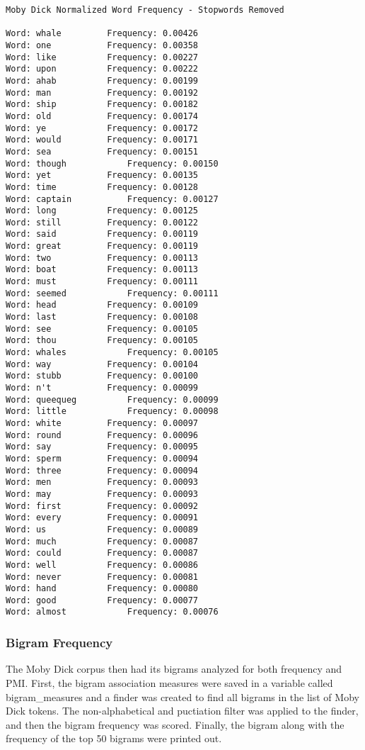 \documentclass[11pt]{article}
\begin{document}
    \begin{Verbatim}[commandchars=\\\{\}]
Moby Dick Normalized Word Frequency - Stopwords Removed

Word: whale        	Frequency: 0.00426
Word: one        	Frequency: 0.00358
Word: like        	Frequency: 0.00227
Word: upon        	Frequency: 0.00222
Word: ahab        	Frequency: 0.00199
Word: man        	Frequency: 0.00192
Word: ship        	Frequency: 0.00182
Word: old        	Frequency: 0.00174
Word: ye        	Frequency: 0.00172
Word: would        	Frequency: 0.00171
Word: sea        	Frequency: 0.00151
Word: though        	Frequency: 0.00150
Word: yet        	Frequency: 0.00135
Word: time        	Frequency: 0.00128
Word: captain        	Frequency: 0.00127
Word: long        	Frequency: 0.00125
Word: still        	Frequency: 0.00122
Word: said        	Frequency: 0.00119
Word: great        	Frequency: 0.00119
Word: two        	Frequency: 0.00113
Word: boat        	Frequency: 0.00113
Word: must        	Frequency: 0.00111
Word: seemed        	Frequency: 0.00111
Word: head        	Frequency: 0.00109
Word: last        	Frequency: 0.00108
Word: see        	Frequency: 0.00105
Word: thou        	Frequency: 0.00105
Word: whales        	Frequency: 0.00105
Word: way        	Frequency: 0.00104
Word: stubb        	Frequency: 0.00100
Word: n't        	Frequency: 0.00099
Word: queequeg        	Frequency: 0.00099
Word: little        	Frequency: 0.00098
Word: white        	Frequency: 0.00097
Word: round        	Frequency: 0.00096
Word: say        	Frequency: 0.00095
Word: sperm        	Frequency: 0.00094
Word: three        	Frequency: 0.00094
Word: men        	Frequency: 0.00093
Word: may        	Frequency: 0.00093
Word: first        	Frequency: 0.00092
Word: every        	Frequency: 0.00091
Word: us        	Frequency: 0.00089
Word: much        	Frequency: 0.00087
Word: could        	Frequency: 0.00087
Word: well        	Frequency: 0.00086
Word: never        	Frequency: 0.00081
Word: hand        	Frequency: 0.00080
Word: good        	Frequency: 0.00077
Word: almost        	Frequency: 0.00076

    \end{Verbatim}

    \subsubsection{Bigram Frequency}\label{bigram-frequency}

The Moby Dick corpus then had its bigrams analyzed for both frequency
and PMI. First, the bigram association measures were saved in a variable
called bigram\_measures and a finder was created to find all bigrams in
the list of Moby Dick tokens. The non-alphabetical and puctiation filter
was applied to the finder, and then the bigram frequency was scored.
Finally, the bigram along with the frequency of the top 50 bigrams were
printed out.
\end{document}
